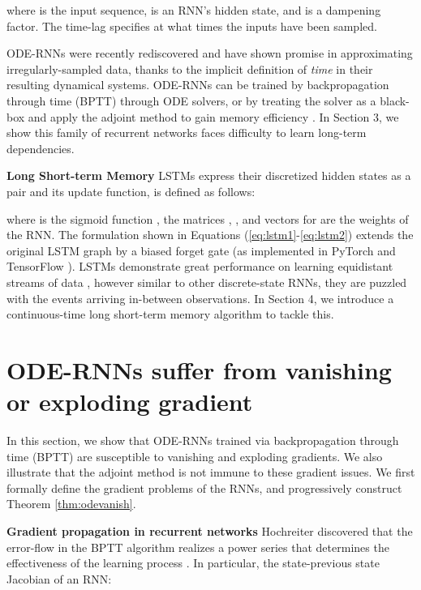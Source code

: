 \documentclass{article}
\begin{document}
where  is the input sequence,  is an RNN's hidden state, and  is a dampening factor. The time-lag  specifies at what times the inputs  have been sampled.

ODE-RNNs were recently rediscovered  \cite{rubanova2019latent} and have shown promise in approximating irregularly-sampled data, thanks to the implicit definition of \emph{time} in their resulting dynamical systems. ODE-RNNs can be trained by backpropagation through time (BPTT) \cite{rumelhart1986learning,werbos1988generalization,werbos1990backpropagation} through ODE solvers, or by treating the solver as a black-box and apply the adjoint method \cite{pontryagin2018mathematical} to gain memory efficiency \cite{chen2018neural}. In Section 3, we show this family of recurrent networks faces difficulty to learn long-term dependencies. 

\textbf{Long Short-term Memory   } LSTMs \cite{hochreiter1997long} express their discretized hidden states as a pair  and its update function,  is defined as follows:



where  is the sigmoid function , the matrices , , and vectors  for  are the weights of the RNN. The formulation shown in Equations (\ref{eq:lstm1}-\ref{eq:lstm2}) extends the original LSTM graph by a biased forget gate \cite{gers1999learning} (as implemented in PyTorch \cite{NEURIPS2019_9015} and TensorFlow \cite{tensorflow2015-whitepaper}). LSTMs demonstrate great performance on learning equidistant streams of data \cite{greff2016lstm}, however similar to other discrete-state RNNs, they are puzzled with the events arriving in-between observations. In Section 4, we introduce a continuous-time long short-term memory algorithm to tackle this.


\section{ODE-RNNs suffer from vanishing or exploding gradient}
In this section, we show that ODE-RNNs trained via backpropagation through time (BPTT) are susceptible to vanishing and exploding gradients. We also illustrate that the adjoint method is not immune to these gradient issues. We first formally define the gradient problems of the RNNs, and progressively construct Theorem \ref{thm:odevanish}.


\textbf{Gradient propagation in recurrent networks   }
Hochreiter \cite{hochreiter1991untersuchungen} discovered that the error-flow in the BPTT algorithm realizes a power series that determines the effectiveness of the learning process \cite{hochreiter1991untersuchungen,hochreiter1997long,bengio1994learning,pascanu2013difficulty}.
In particular, the state-previous state Jacobian of an RNN:
\end{document}
